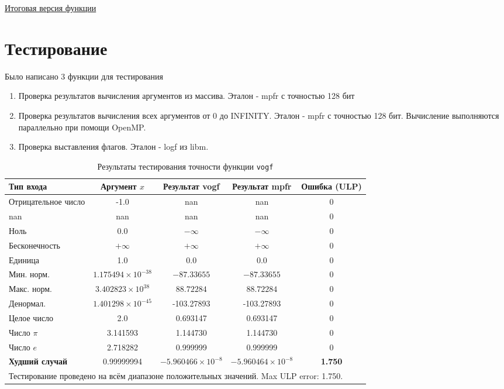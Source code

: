 \documentclass[12pt]{extarticle}
\begin{document}
\href{https://github.com/kzueirf12345/numerical/tree/Task7/7/src/vogf}{Итоговая версия функции}

\section{Тестирование}

Было написано 3 функции для тестирования
\begin{enumerate}
    \item Проверка результатов вычисления аргументов из массива. Эталон - mpfr с точностью 128 бит
    \item Проверка результатов вычисления всех аргументов от 0 до INFINITY. Эталон - mpfr с точностью 128 бит. Вычисление выполняются параллельно при помощи OpenMP.
    \item Проверка выставления флагов. Эталон - logf из libm.
\end{enumerate}

\begin{table}[h!]
\centering
\label{tab:accuracy_results}
\begin{tabular}{lcccc}
\toprule
\textbf{Тип входа} & \textbf{Аргумент $x$} & {\textbf{Результат vogf}} & {\textbf{Результат mpfr}} & \textbf{Ошибка (ULP)} \\
\midrule
Отрицательное число & -1.0 & nan & nan & 0 \\
nan & nan & nan & nan & 0 \\
Ноль & 0.0 & $-\infty$ & $-\infty$ & 0 \\
Бесконечность & $+\infty$ & $+\infty$ & $+\infty$ & 0 \\
Единица & 1.0 & 0.0 & 0.0 & 0 \\
Мин. норм. & $1.175494 \times 10^{-38}$ & $-87.33655$ & $-87.33655$ & $0$ \\
Макс. норм. & $3.402823 \times 10^{38}$ & $88.72284$ & $88.72284$ & $0$ \\
Денормал. & $1.401298 \times 10^{-45}$ & -103.27893 & -103.27893 & 0 \\
Целое число & 2.0 & 0.693147 & 0.693147 & 0 \\
Число $\pi$ & 3.141593 & 1.144730 & 1.144730 & 0 \\
Число $e$ & 2.718282 & 0.999999 & 0.999999 & 0 \\
\midrule
\textbf{Худший случай} & 0.99999994 & $-5.960466 \times 10^{-8}$ & $-5.960464 \times 10^{-8}$ & \textbf{1.750} \\
\bottomrule
\multicolumn{5}{l}{\footnotesize * Тестирование проведено на всём диапазоне положительных значений. Max ULP error: 1.750.}
\end{tabular}
\caption{Результаты тестирования точности функции \texttt{vogf}}
\end{table}
\end{document}

